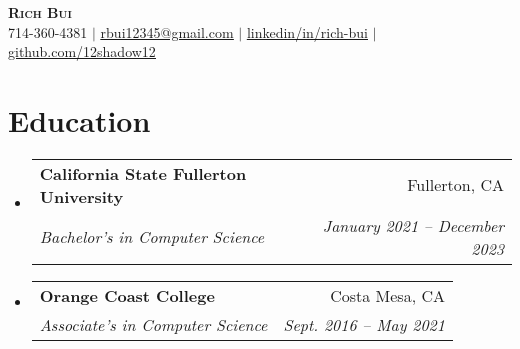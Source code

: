 \documentclass[letterpaper,11pt]{article}
\makeatletter
\newcommand{\resumeSubheading}[4]{
  \vspace{-2pt}\item
    \begin{tabular*}{0.97\textwidth}[t]{l@{\extracolsep{\fill}}r}
      \textbf{#1} & #2 \\
      \textit{\small#3} & \textit{\small #4} \\
    \end{tabular*}\vspace{-7pt}
}
\newcommand{\resumeSubHeadingListStart}{\begin{itemize}[leftmargin=0.15in, label={}]}
\newcommand{\resumeSubHeadingListEnd}{\end{itemize}}
\makeatother
\begin{document}

\begin{center}
    \textbf{\Huge \scshape Rich Bui} \\ \vspace{1pt}
    \small 714-360-4381 $|$ \href{mailto:rbui12345@gmail.com}{\underline{rbui12345@gmail.com}} $|$ 
    \href{https://www.linkedin.com/in/rich-bui-18595524b/}{\underline{linkedin/in/rich-bui}} $|$
    \href{https://github.com/12shadow12}{\underline{github.com/12shadow12}}
\end{center}


\section{Education}
  \resumeSubHeadingListStart
    \resumeSubheading
      {California State Fullerton University}{Fullerton, CA}
      {Bachelor's in Computer Science}{January 2021 -- December 2023}
    \resumeSubheading
      {Orange Coast College}{Costa Mesa, CA}
      {Associate's in Computer Science}{Sept. 2016 -- May 2021}
  \resumeSubHeadingListEnd


\end{document}
